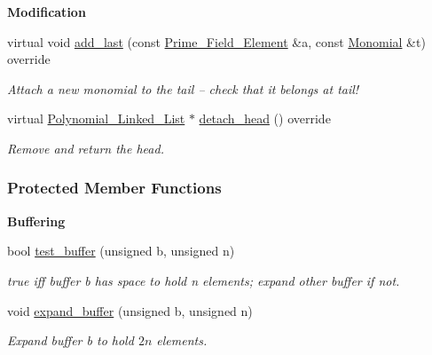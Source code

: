 \begin{Indent}\textbf{ Modification}\par
\begin{DoxyCompactItemize}
\item 
\mbox{\label{group__polygroup_a5bcb9f095148d20d1f428f75e8bd081d}} 
virtual void \hyperlink{group__polygroup_a5bcb9f095148d20d1f428f75e8bd081d}{add\+\_\+last} (const \hyperlink{group___fields_group_class_prime___field___element}{Prime\+\_\+\+Field\+\_\+\+Element} \&a, const \hyperlink{group__polygroup_class_monomial}{Monomial} \&t) override
\begin{DoxyCompactList}\small\item\em Attach a new monomial to the tail -- check that it belongs at tail! \end{DoxyCompactList}\item 
\mbox{\label{group__polygroup_a4414c7a72f980efac7b794525151b653}} 
virtual \hyperlink{group__polygroup_class_polynomial___linked___list}{Polynomial\+\_\+\+Linked\+\_\+\+List} $\ast$ \hyperlink{group__polygroup_a4414c7a72f980efac7b794525151b653}{detach\+\_\+head} () override
\begin{DoxyCompactList}\small\item\em Remove and return the head. \end{DoxyCompactList}\end{DoxyCompactItemize}
\end{Indent}
\subsubsection*{Protected Member Functions}
\begin{Indent}\textbf{ Buffering}\par
\begin{DoxyCompactItemize}
\item 
\mbox{\label{group__polygroup_a399d8bc13840f21ab8a1b8c844053eb9}} 
bool \hyperlink{group__polygroup_a399d8bc13840f21ab8a1b8c844053eb9}{test\+\_\+buffer} (unsigned b, unsigned n)
\begin{DoxyCompactList}\small\item\em {\ttfamily true} iff buffer {\ttfamily b} has space to hold {\ttfamily n} elements; expand other buffer if not. \end{DoxyCompactList}\item 
void \hyperlink{group__polygroup_acd9235d4fe5a56a3a0842a80b4efbdbb}{expand\+\_\+buffer} (unsigned b, unsigned n)
\begin{DoxyCompactList}\small\item\em Expand buffer {\ttfamily b} to hold $ 2n $ elements. \end{DoxyCompactList}\end{DoxyCompactItemize}
\end{Indent}
